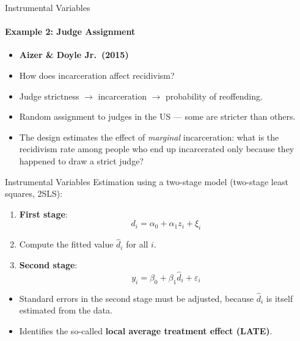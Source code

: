 \documentclass[11pt,aspectratio=169]{beamer}
\begin{document}
\begin{frame}{Instrumental Variables}
  \framesubtitle{Example 2: Judge Assignment}
  \begin{itemize}
    \item \textbf{Aizer \& Doyle Jr.\ (2015)}
    \item How does incarceration affect recidivism?
    \item Judge strictness $\to$ incarceration $\to$ probability of reoffending.
    \item Random assignment to judges in the US --- some are stricter than others.
    \item The design estimates the effect of \emph{marginal} incarceration: what is the recidivism rate among people who end up incarcerated only because they happened to draw a strict judge?
  \end{itemize}
\end{frame}

\begin{frame}{Instrumental Variables}
  Estimation using a two-stage model (two-stage least squares, 2SLS):
  \begin{enumerate}
    \item \textbf{First stage}:
    \[
      d_i = \alpha_0 + \alpha_1 z_i + \xi_i \tag{9}
    \]
    \item Compute the fitted value $\hat d_i$ for all $i$.
    \item \textbf{Second stage}:
    \[
      y_i = \beta_0 + \beta_1 \hat d_i + \varepsilon_i \tag{10}
    \]
  \end{enumerate}
  \begin{itemize}
    \item Standard errors in the second stage must be adjusted, because $\hat d_i$ is itself estimated from the data.
    \item Identifies the so-called \textbf{local average treatment effect (LATE)}.
  \end{itemize}
\end{frame}
\end{document}
